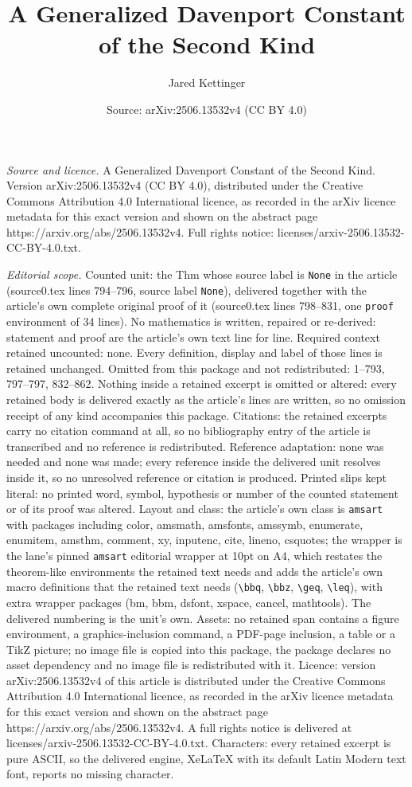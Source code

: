 \documentclass[10pt,a4paper]{amsart}
\title[A Generalized Davenport Constant of the Second Kind]{A Generalized Davenport Constant of the Second Kind}
\author{Jared Kettinger}
\date{Source: arXiv:2506.13532v4 (CC BY 4.0)}
\begin{document}
\maketitle

\noindent\emph{Source and licence.} A Generalized Davenport Constant of the Second Kind. Version arXiv:2506.13532v4 (CC BY 4.0), distributed under the Creative Commons Attribution 4.0 International licence, as recorded in the arXiv licence metadata for this exact version and shown on the abstract page https://arxiv.org/abs/2506.13532v4. Full rights notice: licenses/arxiv-2506.13532-CC-BY-4.0.txt.\par\smallskip

\noindent\textit{Editorial scope.} Counted unit: the Thm whose source label is \texttt{None} in the article (source0.tex lines 794--796, source label \texttt{None}), delivered together with the article's own complete original proof of it (source0.tex lines 798--831, one \texttt{proof} environment of 34 lines). No mathematics is written, repaired or re-derived: statement and proof are the article's own text line for line. Required context retained uncounted: none. Every definition, display and label of those lines is retained unchanged. Omitted from this package and not redistributed: 1--793, 797--797, 832--862. Nothing inside a retained excerpt is omitted or altered: every retained body is delivered exactly as the article's lines are written, so no omission receipt of any kind accompanies this package. Citations: the retained excerpts carry no citation command at all, so no bibliography entry of the article is transcribed and no reference is redistributed. Reference adaptation: none was needed and none was made; every reference inside the delivered unit resolves inside it, so no unresolved reference or citation is produced. Printed slips kept literal: no printed word, symbol, hypothesis or number of the counted statement or of its proof was altered. Layout and class: the article's own class is \texttt{amsart} with packages including color, amsmath, amsfonts, amssymb, enumerate, enumitem, amsthm, comment, xy, inputenc, cite, lineno, csquotes; the wrapper is the lane's pinned \texttt{amsart} editorial wrapper at 10pt on A4, which restates the theorem-like environments the retained text needs and adds the article's own macro definitions that the retained text needs (\texttt{\textbackslash bbq}, \texttt{\textbackslash bbz}, \texttt{\textbackslash geq}, \texttt{\textbackslash leq}), with extra wrapper packages (bm, bbm, dsfont, xspace, cancel, mathtools). The delivered numbering is the unit's own. Assets: no retained span contains a figure environment, a graphics-inclusion command, a PDF-page inclusion, a table or a TikZ picture; no image file is copied into this package, the package declares no asset dependency and no image file is redistributed with it. Licence: version arXiv:2506.13532v4 of this article is distributed under the Creative Commons Attribution 4.0 International licence, as recorded in the arXiv licence metadata for this exact version and shown on the abstract page https://arxiv.org/abs/2506.13532v4. A full rights notice is delivered at licenses/arxiv-2506.13532-CC-BY-4.0.txt. Characters: every retained excerpt is pure ASCII, so the delivered engine, XeLaTeX with its default Latin Modern text font, reports no missing character.
\end{document}

